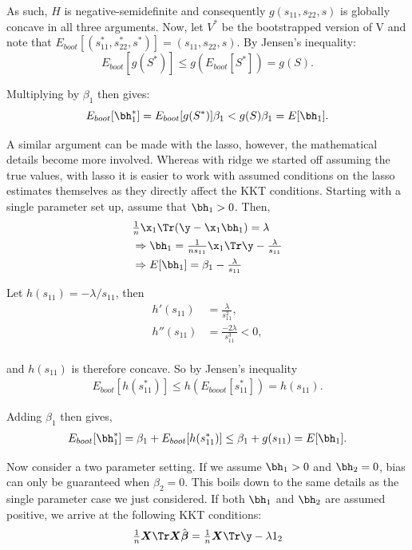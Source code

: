 \noindent As such, $H$ is negative-semidefinite and consequently $g(s_{11},s_{22},s)$ is globally concave in all three arguments. Now, let $V^*$ be the bootstrapped version of V and note that $E_{boot}[(s_{11}^*, s_{22}^*, s^*)] = (s_{11}, s_{22}, s)$. By Jensen's inequality:
$$
E_{boot}[g(S^*)] \leq g(E_{boot}[S^*]) = g(S).
$$

\noindent Multiplying by $\beta_1$ then gives:
$$
E_{boot}[\bh_1^*] = E_{boot}[g(S^*)]\beta_1 < g(S)\beta_1 = E[\bh_1].
$$

A similar argument can be made with the lasso, however, the mathematical details become more involved. Whereas with ridge we started off assuming the true values, with lasso it is easier to work with assumed conditions on the lasso estimates themselves as they directly affect the KKT conditions. Starting with a single parameter set up, assume that $\bh_1 > 0$. Then,
$$
\begin{aligned}
&\tfrac{1}{n}\x_1\Tr(\y - \x_1 \bh_1) = \lambda \\
&\Rightarrow \bh_1 = \tfrac{1}{ns_{11}}\x_1\Tr\y - \tfrac{\lambda}{s_{11}} \\
&\Rightarrow E[\bh_1] = \beta_1 - \tfrac{\lambda}{s_{11}} \\
\end{aligned}
$$

\noindent Let $h(s_{11}) = -\lambda / s_{11}$, then
$$
\begin{aligned}
h'(s_{11}) &= \tfrac{\lambda}{s_{11}^2}, \\
h''(s_{11}) &= \tfrac{-2\lambda}{s_{11}^3}  < 0,\\
\end{aligned}
$$

\noindent and $h(s_{11})$ is therefore concave. So by Jensen's inequality
$$
\begin{aligned}
E_{boot}[h(s_{11}^*)] \leq h(E_{booot}[s_{11}^*]) = h(s_{11}).
\end{aligned}
$$

\noindent Adding $\beta_1$ then gives,
$$
\begin{aligned}
E_{boot}[\bh_1^*] = \beta_1 + E_{boot}[h(s_{11}^*)] \leq \beta_1 + g(s_{11}) = E[\bh_1].
\end{aligned}
$$

Now consider a two parameter setting. If we assume $\bh_1 > 0$ and $\bh_2 = 0$, bias can only be guaranteed when $\beta_2 = 0$. This boils down to the same details as the single parameter case we just considered. If both $\bh_1$ and $\bh_2$ are assumed positive, we arrive at the following KKT conditions:
$$
\begin{aligned}
\tfrac{1}{n}\boldsymbol{X}\Tr\boldsymbol{X} \hat{\boldsymbol{\beta}} &= \tfrac{1}{n}\boldsymbol{X}\Tr \y - \lambda 1_2 \\
\end{aligned}
$$


